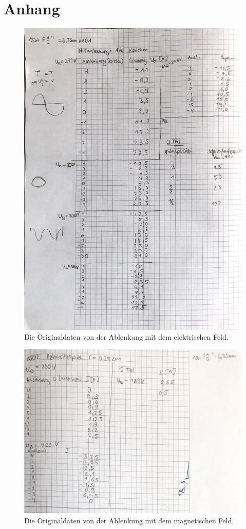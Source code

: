 \section{Anhang}
\label{sec:anhang}

\begin{figure}
    \centering
    \includegraphics[width=\textwidth]{bilder/datenv501.pdf}
    \caption{Die Originaldaten von der Ablenkung mit dem elektrischen Feld.}
    \label{fig:originaldaten_efeld}
\end{figure}

\begin{figure}
    \centering
    \includegraphics[width=\textwidth]{bilder/datenv502.pdf}
    \caption{Die Originaldaten von der Ablenkung mit dem magnetischen Feld.}
    \label{fig:originaldaten_bfeld}
\end{figure}